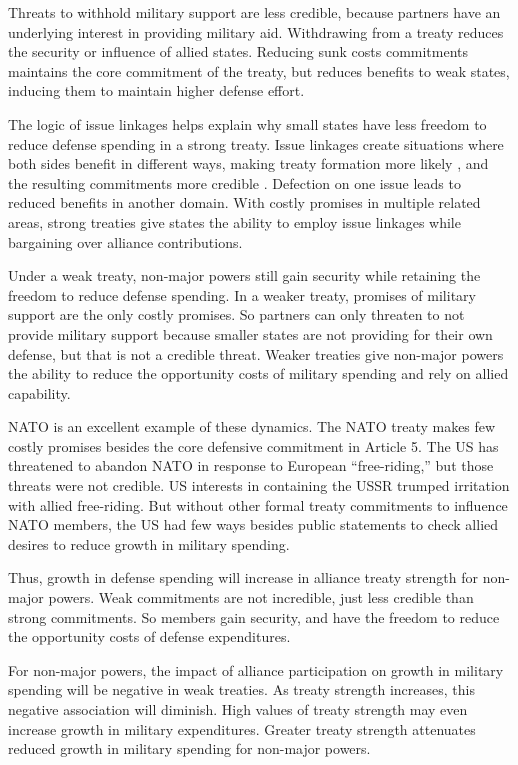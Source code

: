 \documentclass[12pt]{article}
\begin{document}
Threats to withhold military support are less credible, because partners have an underlying interest in providing military aid. 
Withdrawing from a treaty reduces the security or influence of allied states. 
Reducing sunk costs commitments maintains the core commitment of the treaty, but reduces benefits to weak states, inducing them to maintain higher defense effort. 


The logic of issue linkages helps explain why small states have less freedom to reduce defense spending in a strong treaty. 
Issue linkages create situations where both sides benefit in different ways, making treaty formation more likely \citep{Poast2015}, and the resulting commitments more credible \citep{Poast2013}. 
Defection on one issue leads to reduced benefits in another domain. 
With costly promises in multiple related areas, strong treaties give states the ability to employ issue linkages while bargaining over alliance contributions. 


Under a weak treaty, non-major powers still gain security while retaining the freedom to reduce defense spending.    
In a weaker treaty, promises of military support are the only costly promises. 
So partners can only threaten to not provide military support because smaller states are not providing for their own defense, but that is not a credible threat. 
Weaker treaties give non-major powers the ability to reduce the opportunity costs of military spending and rely on allied capability.


NATO is an excellent example of these dynamics. 
The NATO  treaty makes few costly promises besides the core defensive commitment in Article 5.
The US has threatened to abandon NATO in response to European ``free-riding,'' but those threats were not credible. 
US interests in containing the USSR trumped irritation with allied free-riding.  
But without other formal treaty commitments to influence NATO members, the US had few ways besides public statements to check allied desires to reduce growth in military spending. 


Thus, growth in defense spending will increase in alliance treaty strength for non-major powers. 
Weak commitments are not incredible, just less credible than strong commitments. 
So members gain security, and have the freedom to reduce the opportunity costs of defense expenditures. 


For non-major powers, the impact of alliance participation on growth in military spending will be negative in weak treaties.
As treaty strength increases, this negative association will diminish. 
High values of treaty strength may even increase growth in military expenditures. 
Greater treaty strength attenuates reduced growth in military spending for non-major powers. 
\end{document}
